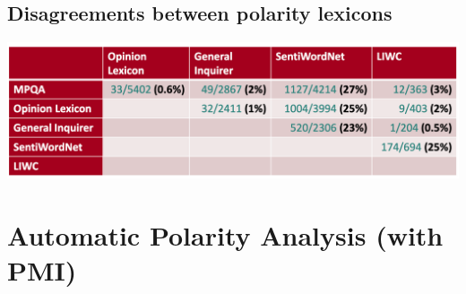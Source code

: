 \documentclass[11pt]{article}
\theoremstyle{definition}
\begin{document}
\subsection{Disagreements between polarity lexicons}
\includegraphics[width=\textwidth]{14.png}

\section{Automatic Polarity
Analysis (with PMI)}
\end{document}
